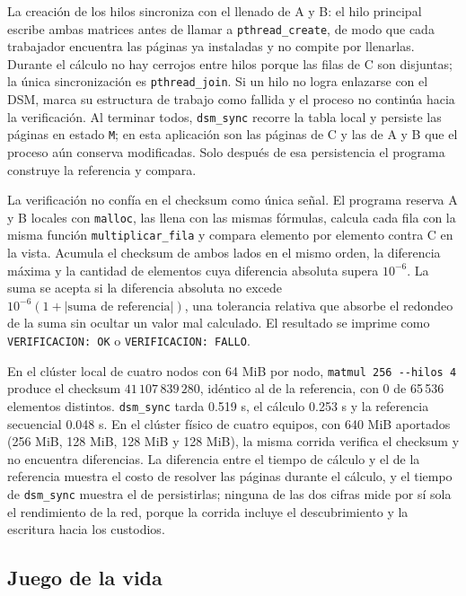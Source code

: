 La creación de los hilos sincroniza con el llenado de A y B: el hilo principal escribe ambas matrices antes de llamar a \texttt{pthread\_create}, de modo que cada trabajador encuentra las páginas ya instaladas y no compite por llenarlas. Durante el cálculo no hay cerrojos entre hilos porque las filas de C son disjuntas; la única sincronización es \texttt{pthread\_join}. Si un hilo no logra enlazarse con el DSM, marca su estructura de trabajo como fallida y el proceso no continúa hacia la verificación. Al terminar todos, \texttt{dsm\_sync} recorre la tabla local y persiste las páginas en estado \texttt{M}; en esta aplicación son las páginas de C y las de A y B que el proceso aún conserva modificadas. Solo después de esa persistencia el programa construye la referencia y compara.

La verificación no confía en el checksum como única señal. El programa reserva A y B locales con \texttt{malloc}, las llena con las mismas fórmulas, calcula cada fila con la misma función \texttt{multiplicar\_fila} y compara elemento por elemento contra C en la vista. Acumula el checksum de ambos lados en el mismo orden, la diferencia máxima y la cantidad de elementos cuya diferencia absoluta supera $10^{-6}$. La suma se acepta si la diferencia absoluta no excede $10^{-6}(1+|\text{suma de referencia}|)$, una tolerancia relativa que absorbe el redondeo de la suma sin ocultar un valor mal calculado. El resultado se imprime como \texttt{VERIFICACION: OK} o \texttt{VERIFICACION: FALLO}.

En el clúster local de cuatro nodos con 64 MiB por nodo, \texttt{matmul 256 -{}-hilos 4} produce el checksum $41\,107\,839\,280$, idéntico al de la referencia, con 0 de 65\,536 elementos distintos. \texttt{dsm\_sync} tarda 0.519 s, el cálculo 0.253 s y la referencia secuencial 0.048 s. En el clúster físico de cuatro equipos, con 640 MiB aportados (256 MiB, 128 MiB, 128 MiB y 128 MiB), la misma corrida verifica el checksum y no encuentra diferencias. La diferencia entre el tiempo de cálculo y el de la referencia muestra el costo de resolver las páginas durante el cálculo, y el tiempo de \texttt{dsm\_sync} muestra el de persistirlas; ninguna de las dos cifras mide por sí sola el rendimiento de la red, porque la corrida incluye el descubrimiento y la escritura hacia los custodios.

\subsection{Juego de la vida}\label{sec:vida}

